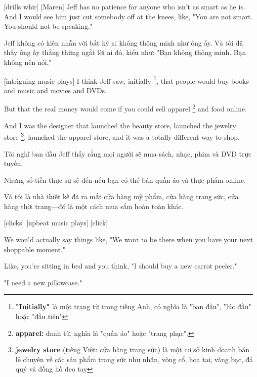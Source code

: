 \documentclass[a4paper]{article}
\begin{document}
	[drills whir]
	[Maren] Jeff has no patience for anyone who isn't as smart as he is.
	And I would see him just cut somebody off at the knees, like, "You are not smart. You should not be speaking."
	
	\begin{vietnamese-v2}
		 Jeff không có kiên nhẫn với bất kỳ ai không thông minh như ông ấy. 
		Và tôi đã thấy ông ấy thẳng thừng ngắt lời ai đó, kiểu như: "Bạn không thông minh. Bạn không nên nói."
	\end{vietnamese-v2}
	
	[intriguing music plays]
	I think Jeff saw, initially \footnote{
		\textbf{"Initially"} là một trạng từ trong tiếng Anh, có nghĩa là "ban đầu", "lúc đầu" hoặc "đầu tiên"
	
	}, that people would buy books and music and movies and DVDs.
	
	But that the real money would come if you could sell apparel \footnote{
		\textbf{apparel:} danh từ, nghĩa là "quần áo" hoặc "trang phục".
	
	} and food online.
	
	And I was the designer that launched the beauty store, launched the jewelry store \footnote{
		\textbf{jewelry store} (tiếng Việt: cửa hàng trang sức) là một cơ sở kinh doanh bán lẻ chuyên về các sản phẩm trang sức như nhẫn, vòng cổ, hoa tai, vàng bạc, đá quý và đồng hồ đeo tay
	
	}, launched the apparel store, and it was a totally different way to shop.
	
	\begin{vietnamese-v2}
		 Tôi nghĩ ban đầu Jeff thấy rằng mọi người sẽ mua sách, nhạc, phim và DVD trực tuyến. 
		
		Nhưng số tiền thực sự sẽ đến nếu bạn có thể bán quần áo và thực phẩm online. 
		
		Và tôi là nhà thiết kế đã ra mắt cửa hàng mỹ phẩm, cửa hàng trang sức, cửa hàng thời trang—đó là một cách mua sắm hoàn toàn khác.
	\end{vietnamese-v2}
	
	[clicks]
	[upbeat music plays]
	[click]
	
	We would actually say things like, "We want to be there when you have your next shoppable moment."
	
	Like, you're sitting in bed and you think, "I should buy a new carrot peeler."
	
	"I need a new pillowcase."
	
\end{document}
